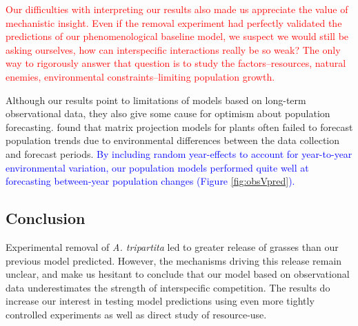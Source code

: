 \documentclass[11pt]{article}
\newcommand{\new}{\textcolor{red}}
\newcommand{\spe}{\textcolor{blue}}
\begin{document}
\begin{doublespacing}
\new{Our difficulties with interpreting our results also made us appreciate the value of mechanistic insight. Even if the removal experiment had perfectly validated the predictions of our phenomenological baseline model, we suspect we would still be asking ourselves, how can interspecific interactions really be so weak? The only way to rigorously answer that question is to study the factors--resources, natural enemies, environmental constraints--limiting population growth. }

Although our results point to limitations of models based on long-term observational data, they also give some cause for optimism about population forecasting. \citet{Crone2013} found that matrix projection models for plants often failed to forecast population trends due 
to environmental differences between the data collection and forecast periods. 
\spe{By including random year-effects to account for year-to-year environmental variation, our population models performed quite well
at forecasting between-year population changes (Figure \ref{fig:obsVpred}). } 

\subsection*{Conclusion}

Experimental removal of \textit{A. tripartita} led to greater release of grasses than our previous model predicted. However, the mechanisms driving this  release remain unclear, and make us hesitant to conclude that our model based on observational data underestimates the strength of interspecific competition. The results do increase our interest in testing model predictions using even more tightly controlled experiments as well as direct study of resource-use.


\end{doublespacing}
\end{document}
